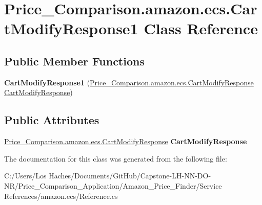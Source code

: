 \hypertarget{class_price___comparison_1_1amazon_1_1ecs_1_1_cart_modify_response1}{\section{Price\-\_\-\-Comparison.\-amazon.\-ecs.\-Cart\-Modify\-Response1 Class Reference}
\label{class_price___comparison_1_1amazon_1_1ecs_1_1_cart_modify_response1}
}
\subsection*{Public Member Functions}
\begin{DoxyCompactItemize}
\item 
\hypertarget{class_price___comparison_1_1amazon_1_1ecs_1_1_cart_modify_response1_a66c46203c0f23b1953212f9e696ff209}{{\bfseries Cart\-Modify\-Response1} (\hyperlink{class_price___comparison_1_1amazon_1_1ecs_1_1_cart_modify_response}{Price\-\_\-\-Comparison.\-amazon.\-ecs.\-Cart\-Modify\-Response} \hyperlink{class_price___comparison_1_1amazon_1_1ecs_1_1_cart_modify_response}{Cart\-Modify\-Response})}\label{class_price___comparison_1_1amazon_1_1ecs_1_1_cart_modify_response1_a66c46203c0f23b1953212f9e696ff209}

\end{DoxyCompactItemize}
\subsection*{Public Attributes}
\begin{DoxyCompactItemize}
\item 
\hypertarget{class_price___comparison_1_1amazon_1_1ecs_1_1_cart_modify_response1_a2bfdd8ae9c1f0c87334f6f4f8e00590c}{\hyperlink{class_price___comparison_1_1amazon_1_1ecs_1_1_cart_modify_response}{Price\-\_\-\-Comparison.\-amazon.\-ecs.\-Cart\-Modify\-Response} {\bfseries Cart\-Modify\-Response}}\label{class_price___comparison_1_1amazon_1_1ecs_1_1_cart_modify_response1_a2bfdd8ae9c1f0c87334f6f4f8e00590c}

\end{DoxyCompactItemize}


The documentation for this class was generated from the following file\-:\begin{DoxyCompactItemize}
\item 
C\-:/\-Users/\-Los Haches/\-Documents/\-Git\-Hub/\-Capstone-\/\-L\-H-\/\-N\-N-\/\-D\-O-\/\-N\-R/\-Price\-\_\-\-Comparison\-\_\-\-Application/\-Amazon\-\_\-\-Price\-\_\-\-Finder/\-Service References/amazon.\-ecs/Reference.\-cs\end{DoxyCompactItemize}
